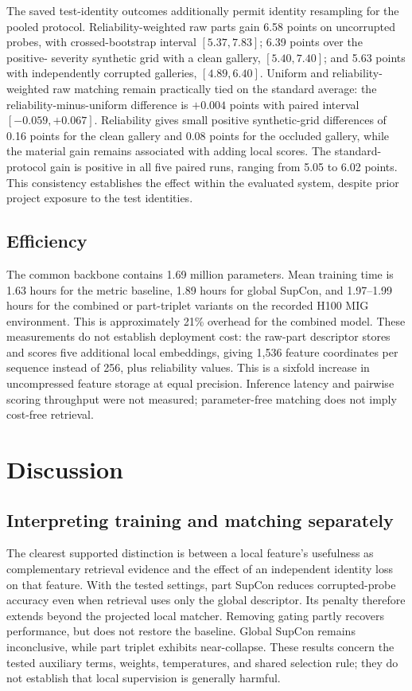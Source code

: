 \documentclass[pdflatex,iicol,sn-apa]{sn-jnl}
\begin{document}
The saved test-identity outcomes additionally permit identity resampling for
the pooled protocol. Reliability-weighted raw parts gain 6.58 points on uncorrupted probes,
with crossed-bootstrap interval $[5.37,7.83]$; 6.39 points over the positive-
severity synthetic grid with a clean gallery, $[5.40,7.40]$; and 5.63 points
with independently corrupted galleries, $[4.89,6.40]$. Uniform and reliability-
weighted raw matching remain practically tied on the standard average: the
reliability-minus-uniform difference is $+0.004$ points with paired interval
$[-0.059,+0.067]$. Reliability gives small positive synthetic-grid differences
of 0.16 points for the clean gallery and 0.08 points for the occluded gallery,
while the material gain remains associated with adding local scores.
The standard-protocol gain is positive in all five paired runs, ranging
from 5.05 to 6.02 points. This consistency establishes the effect within
the evaluated system, despite prior project exposure to the test identities.

\subsection{Efficiency}

The common backbone contains 1.69 million parameters. Mean training time is
1.63 hours for the metric baseline, 1.89 hours for global SupCon, and
1.97--1.99 hours for the combined or part-triplet variants on the recorded H100
MIG environment. This is approximately 21\% overhead for the combined model. These measurements do
not establish deployment cost: the raw-part descriptor stores and scores
five additional local embeddings, giving 1,536 feature coordinates per sequence instead of 256, plus
reliability values. This is a sixfold increase in uncompressed feature
storage at equal precision. Inference latency and pairwise scoring throughput
were not measured; parameter-free matching does not imply cost-free retrieval.

\section{Discussion}

\subsection{Interpreting training and matching separately}

The clearest supported distinction is between a local feature's usefulness as
complementary retrieval evidence and the effect of an independent identity loss
on that feature. With the tested settings, part SupCon reduces corrupted-probe
accuracy even when retrieval uses only the global descriptor. Its penalty
therefore extends beyond the projected local matcher. Removing gating partly
recovers performance, but does not restore the baseline. Global SupCon remains
inconclusive, while part triplet exhibits near-collapse. These results concern
the tested auxiliary terms, weights, temperatures, and shared selection rule;
they do not establish that local supervision is generally harmful.
\end{document}

